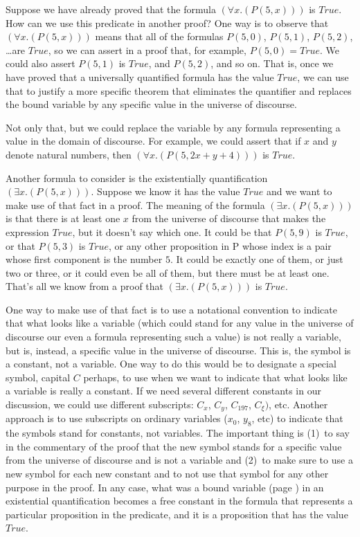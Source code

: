 {Suppose we have already proved that the formula $(\forall x.(P(5, x)))$ is $True$.
How can we use this predicate in another proof?
One way is to observe that $(\forall x.(P(5, x)))$ means that all of the formulas
$P(5, 0)$, $P(5, 1)$, $P(5, 2)$, \dots are $True$,
so we can assert in a proof that, for example,
$P(5, 0) = True$. We could also assert $P(5, 1)$ is $True$, and $P(5, 2)$, and so on.
That is, once we have proved that a universally quantified formula has the value $True$,
we can use that to justify a more specific theorem that
eliminates the quantifier and replaces the bound variable by any specific value
in the universe of discourse.

Not only that, but we could replace the variable by any formula
representing a value in the domain of discourse.
For example, we could assert that if $x$ and $y$ denote natural numbers,
then $(\forall x.(P(5, 2x + y + 4)))$ is $True$.

Another formula to consider is the existentially quantification $(\exists x.(P(5, x)))$.
Suppose we know it has the value $True$ and we want to make use of that fact in a proof.
The meaning of the formula $(\exists x.(P(5, x)))$ is that
there is at least one $x$ from the universe of discourse that makes the expression $True$,
but it doesn't say which one.
It could be that $P(5, 9)$ is $True$, or that $P(5, 3)$ is $True$,
or any other proposition in P whose index is a pair whose first component is the number $5$.
It could be exactly one of them,
or just two or three, or it could even be all of them, but
there must be at least one. That's all we know
from a proof that $(\exists x.(P(5, x)))$ is $True$.

One way to make use of that fact is to use a notational convention
to indicate that what looks like a variable (which could stand for any
value in the universe of discourse our even a formula representing such a value)
is not really a variable, but is, instead, a specific value in the universe of
discourse. This is, the symbol is a constant, not a variable.
One way to do this would be to designate a special symbol, capital $C$ perhaps,
to use when we want to indicate that what looks like a variable is really a constant.
\label{def:skolem-constant}
If we need several different constants in our discussion, we could use different
subscripts: $C_x$, $C_y$, $C_{197}$, $C_{\xi})$, etc.
Another approach is to use subscripts on ordinary variables ($x_0$, $y_8$, etc)
to indicate that the symbols stand for constants, not variables.
The important thing is (1)~to say in the commentary of the proof that the new
symbol stands for a specific value from the universe of discourse and is not a variable
and (2)~to make sure to use a new symbol for each new constant and to not use that
symbol for any other purpose in the proof. In any case, what was a
bound variable (page \pageref{def:bound-variable}) in an existential quantification
becomes a free constant in the formula that represents a particular proposition in the
predicate, and it is a proposition that has the value $True$.

}

